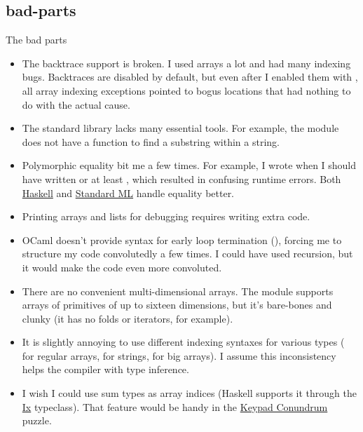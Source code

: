 \documentclass{article}
\begin{document}
\subsection{bad-parts}{The bad parts}
\begin{itemize}
\item The backtrace support is broken.
  I used arrays a lot and had many indexing bugs.
  Backtraces are disabled by default, but even after I enabled them with , all array indexing exceptions pointed to bogus locations that had nothing to do with the actual cause.
\item
  The standard library lacks many essential tools.
  For example, the \href{https://ocaml.org/manual/5.2/api/String.html}{} module does not have a function to find a substring within a string.
\item
  Polymorphic equality bit me a few times.
  For example, I wrote  when I should have written  or at least , which resulted in confusing runtime errors.
  Both \href{https://www.haskell.org/?uwu=true}{Haskell} and \href{https://en.wikipedia.org/wiki/Standard_ML}{Standard ML} handle equality better.
\item
  Printing arrays and lists for debugging requires writing extra code.
\item
  OCaml doesn’t provide syntax for early loop termination (), forcing me to structure my code convolutedly a few times.
  I could have used recursion, but it would make the code even more convoluted.
\item
  There are no convenient multi-dimensional arrays.
  The  module supports arrays of primitives of up to sixteen dimensions, but it’s bare-bones and clunky (it has no folds or iterators, for example).
\item
  It is slightly annoying to use different indexing syntaxes for various types ( for regular arrays,  for strings,  for big arrays).
  I assume this inconsistency helps the compiler with type inference.
\item
  I wish I could use sum types as array indices (Haskell supports it through the \href{https://hackage.haskell.org/package/base-4.21.0.0/docs/Data-Ix.html}{Ix} typeclass).
  That feature would be handy in the \href{#keypad-conundrum}{Keypad Conundrum} puzzle.
\end{itemize}
\end{document}
